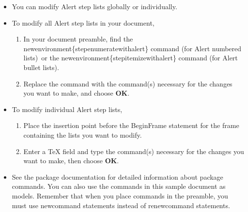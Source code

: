 \documentclass[notes=show,beamer]{beamer}
\begin{document}
\begin{frame}[allowframebreaks]%



\begin{itemize}
\item You can modify Alert step lists globally or individually.

\item To modify all Alert step lists in your document,

\begin{enumerate}
\item In your document preamble, find the \TEXTsymbol{\backslash}%
newenvironment\{stepenumeratewithalert\} command (for Alert numbered lists)\
or the \TEXTsymbol{\backslash}newenvironment\{stepitemizewithalert\} command
(for Alert bullet lists).

\item Replace the command with the command(s) necessary for the changes you
want to make, and choose \textbf{OK}.
\end{enumerate}

\item To modify individual Alert step lists,

\begin{enumerate}
\item Place the insertion point before the BeginFrame statement for the
frame containing the lists you want to modify.

\item Enter a TeX field and type the command(s) necessary for the changes
you want to make, then choose \textbf{OK}.
\end{enumerate}

\item See the package documentation for detailed information about package
commands. You can also use the commands in this sample document as models.
Remember that when you place commands in the preamble, you must use 
\TEXTsymbol{\backslash}newcommand statements instead of \TEXTsymbol{%
\backslash}renewcommand statements.
\end{itemize}

\end{frame}%
\end{document}
